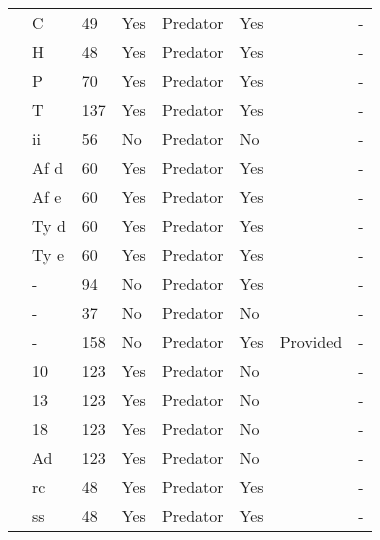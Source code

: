 \begin{longtable}{llllllll}
\citet{Kalinkat:2011bd}&C&49&Yes&Predator&Yes&\citet{Kalinkat:2018aa}&-\tabularnewline
\citet{Kalinkat:2011bd}&H&48&Yes&Predator&Yes&\citet{Kalinkat:2018aa}&-\tabularnewline
\citet{Kalinkat:2011bd}&P&70&Yes&Predator&Yes&\citet{Kalinkat:2018aa}&-\tabularnewline
\citet{Kalinkat:2011bd}&T&137&Yes&Predator&Yes&\citet{Kalinkat:2018aa}&-\tabularnewline
\citet{Krylov:1992aa}&ii&56&No&Predator&No&\citet{Novak:2020aa}&-\tabularnewline
\citet{Lester:2002aa}&Af d&60&Yes&Predator&Yes&\citet{Lester:2020aa}&-\tabularnewline
\citet{Lester:2002aa}&Af e&60&Yes&Predator&Yes&\citet{Lester:2020aa}&-\tabularnewline
\citet{Lester:2002aa}&Ty d&60&Yes&Predator&Yes&\citet{Lester:2020aa}&-\tabularnewline
\citet{Lester:2002aa}&Ty e&60&Yes&Predator&Yes&\citet{Lester:2020aa}&-\tabularnewline
\citet{Long:2012ab}&-&94&No&Predator&Yes&\citet{Long:2020ab}&-\tabularnewline
\citet{Mattila:1998aa}&-&37&No&Predator&No&\citet{Novak:2020aa}&-\tabularnewline
\citet{Nachappa:2006aa}&-&158&No&Predator&Yes&Provided&-\tabularnewline
\citet{Ranta:1985aa}&10&123&Yes&Predator&No&\citet{Novak:2020aa}&-\tabularnewline
\citet{Ranta:1985aa}&13&123&Yes&Predator&No&\citet{Novak:2020aa}&-\tabularnewline
\citet{Ranta:1985aa}&18&123&Yes&Predator&No&\citet{Novak:2020aa}&-\tabularnewline
\citet{Ranta:1985aa}&Ad&123&Yes&Predator&No&\citet{Novak:2020aa}&-\tabularnewline
\citet{Wong:2005aa}&rc&48&Yes&Predator&Yes&\citet{Wong:2020ab}&-\tabularnewline
\citet{Wong:2005aa}&ss&48&Yes&Predator&Yes&\citet{Wong:2020ab}&-\tabularnewline
\hline
\end{longtable}
